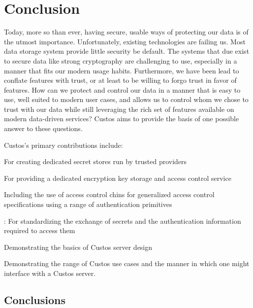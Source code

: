 \chapter{Conclusion}
\label{chap:conclusion}

Today, more so than ever, having secure, usable ways of protecting our
data is of the utmost importance. Unfortunately, existing technologies
are failing us. Most data storage system provide little security be
default. The systems that due exist to secure data like strong
cryptography are challenging to use, especially in a manner that fits
our modern usage habits. Furthermore, we have been lead to conflate
features with trust, or at least to be willing to forgo trust in favor
of features. How can we protect and control our data in a manner that
is easy to use, well suited to modern user cases, and allows us to
control whom we chose to trust with our data while still leveraging
the rich set of features available on modern data-driven services?
Custos aims to provide the basis of one possible answer to these
questions.

Custos's primary contributions include:

\begin{packed_desc}
\item[Trust-Separation Architecture:] For creating dedicated secret
  stores run by trusted providers
\item[``Key Storage as a Service Platform:] For providing a dedicated
  encryption key storage and access control service
\item[A generic, flexible access control scheme:] Including the use of
  access control chins for generalized access control specifications
  using a range of authentication primitives
\item[Custos protocol]: For standardizing the exchange of secrets and
  the authentication information required to access them
\item[Custos Server Design and Implementing:] Demonstrating the basics
  of Custos server design
\item[Several Proof-of-Concept Custos Applications:] Demonstrating the
  range of Custos use cases and the manner in which one might
  interface with a Custos server.
\end{packed_desc}

\section{Conclusions}

